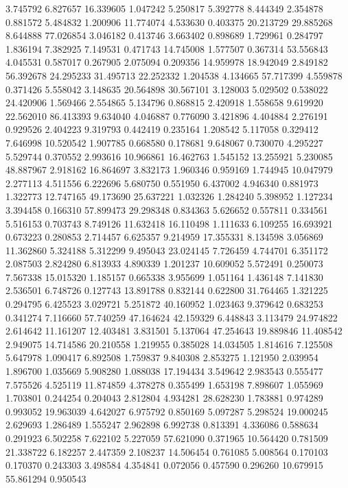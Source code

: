 3.745792
6.827657
16.339605
1.047242
5.250817
5.392778
8.444349
2.354878
0.881572
5.484832
1.200906
11.774074
4.533630
0.403375
20.213729
29.885268
8.644888
77.026854
3.046182
0.413746
3.663402
0.898689
1.729961
0.284797
1.836194
7.382925
7.149531
0.471743
14.745008
1.577507
0.367314
53.556843
4.045531
0.587017
0.267905
2.075094
0.209356
14.959978
18.942049
2.849182
56.392678
24.295233
31.495713
22.252332
1.204538
4.134665
57.717399
4.559878
0.371426
5.558042
3.148635
20.564898
30.567101
3.128003
5.029502
0.538022
24.420906
1.569466
2.554865
5.134796
0.868815
2.420918
1.558658
9.619920
22.562010
86.413393
9.634040
4.046887
0.776090
3.421896
4.404884
2.276191
0.929526
2.404223
9.319793
0.442419
0.235164
1.208542
5.117058
0.329412
7.646998
10.520542
1.907785
0.668580
0.178681
9.648067
0.730070
4.295227
5.529744
0.370552
2.993616
10.966861
16.462763
1.545152
13.255921
5.230085
48.887967
2.918162
16.864697
3.832173
1.960346
0.959169
1.744945
10.047979
2.277113
4.511556
6.222696
5.680750
0.551950
6.437002
4.946340
0.881973
1.322773
12.747165
49.173690
25.637221
1.032326
1.284240
5.398952
1.127234
3.394458
0.166310
57.899473
29.298348
0.834363
5.626652
0.557811
0.334561
5.516153
0.703743
8.749126
11.632418
16.110498
1.111633
6.109255
16.693921
0.673223
0.280853
2.714457
6.625357
9.214959
17.355331
8.134598
3.056869
11.362860
5.324188
5.312299
9.495043
23.024145
7.726459
4.744701
6.351172
2.087503
2.824280
6.813933
4.890339
1.201237
10.609052
5.572491
0.250073
7.567338
15.015320
1.185157
0.665338
3.955699
1.051164
1.436148
7.141830
2.536501
6.748726
0.127743
13.891788
0.832144
0.622800
31.764465
1.321225
0.294795
6.425523
3.029721
5.251872
40.160952
1.023463
9.379642
0.683253
0.341274
7.116660
57.740259
47.164624
42.159329
6.448843
3.113479
24.974822
2.614642
11.161207
12.403481
3.831501
5.137064
47.254643
19.889846
11.408542
2.949075
14.714586
20.210558
1.219955
0.385028
14.034505
1.814616
7.125508
5.647978
1.090417
6.892508
1.759837
9.840308
2.853275
1.121950
2.039954
1.896700
1.035669
5.908280
1.088038
17.194434
3.549642
2.983543
0.555477
7.575526
4.525119
11.874859
4.378278
0.355499
1.653198
7.898607
1.055969
1.703801
0.244254
0.204043
2.812804
4.934281
28.628230
1.783881
0.974289
0.993052
19.963039
4.642027
6.975792
0.850169
5.097287
5.298524
19.000245
2.629693
1.286489
1.555247
2.962898
6.992738
0.813391
4.336086
0.588634
0.291923
6.502258
7.622102
5.227059
57.621090
0.371965
10.564420
0.781509
21.338722
6.182257
2.447359
2.108237
14.506454
0.761085
5.008564
0.170103
0.170370
0.243303
3.498584
4.354841
0.072056
0.457590
0.296260
10.679915
55.861294
0.950543

